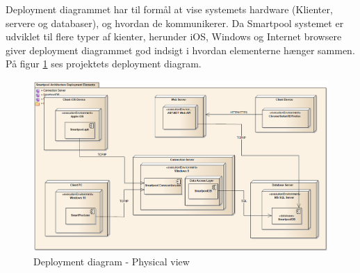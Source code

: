Deployment diagrammet har til formål at vise systemets hardware (Klienter, servere og databaser), og hvordan de kommunikerer. Da Smartpool systemet er udviklet til flere typer af kienter, herunder iOS, Windows og Internet browsere giver deployment diagrammet god indsigt i hvordan elementerne hænger sammen.
På figur \ref{fig:deploymentView} ses projektets deployment diagram.

\begin{figure}
	\centering
	\includegraphics[width=\linewidth]{figs/arkitektur/deploymentView.PNG}
	\caption{Deployment diagram - Physical view}
	\label{fig:deploymentView}
\end{figure}

